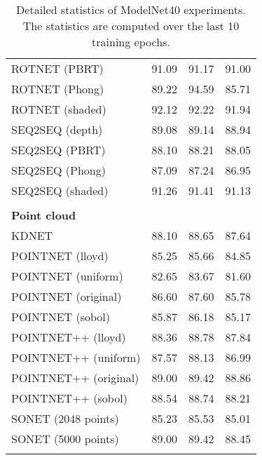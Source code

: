 \begin{table}[!h]
\begin{tabular}{lccc}
	    	ROTNET (PBRT)          &     91.09     &    91.17     &    91.00     \\
	    	ROTNET (Phong)         &     89.22     &    94.59     &    85.71     \\
	    	ROTNET (shaded)        &     92.12     &    92.22     &    91.94     \\
	    	SEQ2SEQ (depth)        &     89.08     &    89.14     &    88.94     \\
	    	SEQ2SEQ (PBRT)         &     88.10     &    88.21     &    88.05     \\
	    	SEQ2SEQ (Phong)        &     87.09     &    87.24     &    86.95     \\
	    	SEQ2SEQ (shaded)       &     91.26     &    91.41     &    91.13     \\ \hline
	    	                       &               &              &              \\
	    	\textbf{Point cloud  } &               &              &              \\
	    	KDNET                  &     88.10     &    88.65     &    87.64     \\
	    	POINTNET (lloyd)       &     85.25     &    85.66     &    84.85     \\
	    	POINTNET (uniform)     &     82.65     &    83.67     &    81.60     \\
	    	POINTNET (original)    &     86.60     &    87.60     &    85.78     \\
	    	POINTNET (sobol)       &     85.87     &    86.18     &    85.17     \\
	    	POINTNET++ (lloyd)     &     88.36     &    88.78     &    87.84     \\
	    	POINTNET++ (uniform)   &     87.57     &    88.13     &    86.99     \\
	    	POINTNET++ (original)  &     89.00     &    89.42     &    88.86     \\
	    	POINTNET++ (sobol)     &     88.54     &    88.74     &    88.21     \\
	    	SONET (2048 points)    &     85.23     &    85.53     &    85.01     \\
	    	SONET (5000 points)    &     89.00     &    89.42     &    88.45     \\ \hline
	    	                       &               &              &
	    \end{tabular}
\caption{Detailed statistics of ModelNet40 experiments. The statistics are computed over the last 10 training epochs.}
\label{Table:details}
\end{table}
